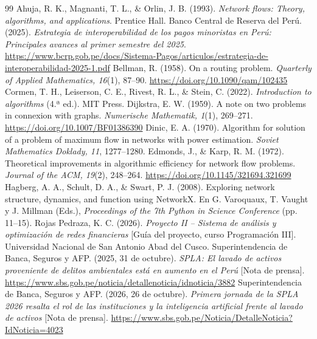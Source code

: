 \documentclass[11pt,a4paper]{article}
\begin{document}
\renewcommand{\refname}{Referencias}
{\small
{}
\begin{thebibliography}{99}
 Ahuja, R. K., Magnanti, T. L., \& Orlin, J. B. (1993). \textit{Network flows: Theory, algorithms, and applications}. Prentice Hall.
 Banco Central de Reserva del Perú. (2025). \textit{Estrategia de interoperabilidad de los pagos minoristas en Perú: Principales avances al primer semestre del 2025}. \url{https://www.bcrp.gob.pe/docs/Sistema-Pagos/articulos/estrategia-de-interoperabilidad-2025-1.pdf}
 Bellman, R. (1958). On a routing problem. \textit{Quarterly of Applied Mathematics, 16}(1), 87--90. \url{https://doi.org/10.1090/qam/102435}
 Cormen, T. H., Leiserson, C. E., Rivest, R. L., \& Stein, C. (2022). \textit{Introduction to algorithms} (4.ª ed.). MIT Press.
 Dijkstra, E. W. (1959). A note on two problems in connexion with graphs. \textit{Numerische Mathematik, 1}(1), 269--271. \url{https://doi.org/10.1007/BF01386390}
 Dinic, E. A. (1970). Algorithm for solution of a problem of maximum flow in networks with power estimation. \textit{Soviet Mathematics Doklady, 11}, 1277--1280.
 Edmonds, J., \& Karp, R. M. (1972). Theoretical improvements in algorithmic efficiency for network flow problems. \textit{Journal of the ACM, 19}(2), 248--264. \url{https://doi.org/10.1145/321694.321699}
 Hagberg, A. A., Schult, D. A., \& Swart, P. J. (2008). Exploring network structure, dynamics, and function using NetworkX. En G. Varoquaux, T. Vaught y J. Millman (Eds.), \textit{Proceedings of the 7th Python in Science Conference} (pp. 11--15).
 Rojas Pedraza, K. C. (2026). \textit{Proyecto II – Sistema de análisis y optimización de redes financieras} [Guía del proyecto, curso Programación III]. Universidad Nacional de San Antonio Abad del Cusco.
 Superintendencia de Banca, Seguros y AFP. (2025, 31 de octubre). \textit{SPLA: El lavado de activos proveniente de delitos ambientales está en aumento en el Perú} [Nota de prensa]. \url{https://www.sbs.gob.pe/noticia/detallenoticia/idnoticia/3882}
 Superintendencia de Banca, Seguros y AFP. (2026, 26 de octubre). \textit{Primera jornada de la SPLA 2026 resalta el rol de las instituciones y la inteligencia artificial frente al lavado de activos} [Nota de prensa]. \url{https://www.sbs.gob.pe/Noticia/DetalleNoticia?IdNoticia=4023}

\end{thebibliography}}
\end{document}
